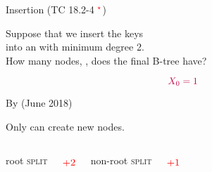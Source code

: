 
\begin{frame}{}
  \begin{exampleblock}{Insertion (TC 18.2-4$\;^{\textcolor{red}{\star}}$)}
    \begin{center}
      Suppose that we insert the keys   \\[5pt]
      into an  with minimum degree 2. \\[6pt]
      How many nodes, , does the final B-tree have?
    \end{center}
  \end{exampleblock}

  \pause
  \vspace{0.60cm}
  \[
    \textcolor{purple}{X_{0} = 1}
  \]
\end{frame}

\begin{frame}{}
  \begin{center}
    By  (June 2018) \\[20pt]
    \href{https://maxmute.com/TC18.2-4.html}{}
  \end{center}
\end{frame}

\begin{frame}{}
  \begin{center}
    Only  can create new nodes.
  \end{center}

  \pause
  \begin{columns}

      \begin{center}
        root \textsc{split}
      \end{center}
      \[
        \textcolor{red}{+2}
      \]
    \pause

      \begin{center}
        non-root \textsc{split}
      \end{center}
      \[
        \textcolor{red}{+1}
      \]
  \end{columns}
\end{frame}

